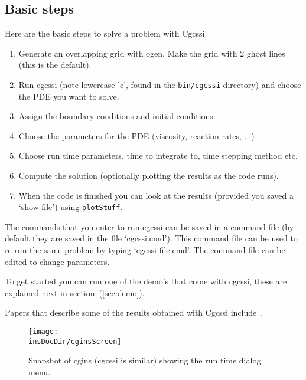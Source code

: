 \documentclass{article}
\newcommand{\Index}[1]{#1\index{#1}}
\newcommand{\insDocDir}{../ins}
\begin{document}
\subsection{Basic steps}
Here are the basic steps to solve a problem with Cgcssi.
\begin{enumerate}
  \item Generate an overlapping grid with ogen. Make the grid with 2 ghost lines (this is the default).
  \item Run cgcssi (note lowercase 'c', found in the {\tt bin/cgcssi} directory) 
        and choose the PDE you want to solve.
  \item Assign the boundary conditions and initial conditions.
  \item Choose the parameters for the PDE (viscosity, reaction rates, ...)
  \item Choose run time parameters, time to integrate to, time stepping method etc.
  \item Compute the solution (optionally plotting the results as the code runs).
  \item When the code is finished you can look at the results (provided you saved a
     `show file') using {\tt plotStuff}.
\end{enumerate}
The commands that you enter to run cgcssi can be saved in a \Index{command file} (by default
they are saved in the file `cgcssi.cmd'). This command file can be used to re-run
the same problem by typing `cgcssi file.cmd'. The command file can be edited to change parameters.

To get started you can run one of the demo's that come with cgcssi, these are 
explained next in section~(\ref{sec:demo}).

Papers that describe some of the results obtained with Cgcssi include~\cite{pog2008,mog2006,reactamr2003b}. 
  
\begin{figure}[hbt]
\begin{center}
  \texttt{[image: \\insDocDir/cginsScreen]} \\
  \caption{Snapshot of cgins (cgcssi is similar) showing the run time dialog menu.}
  \end{center} 
  \label{fig:runTimeScreen}
\end{figure}


\clearpage

\end{document}
